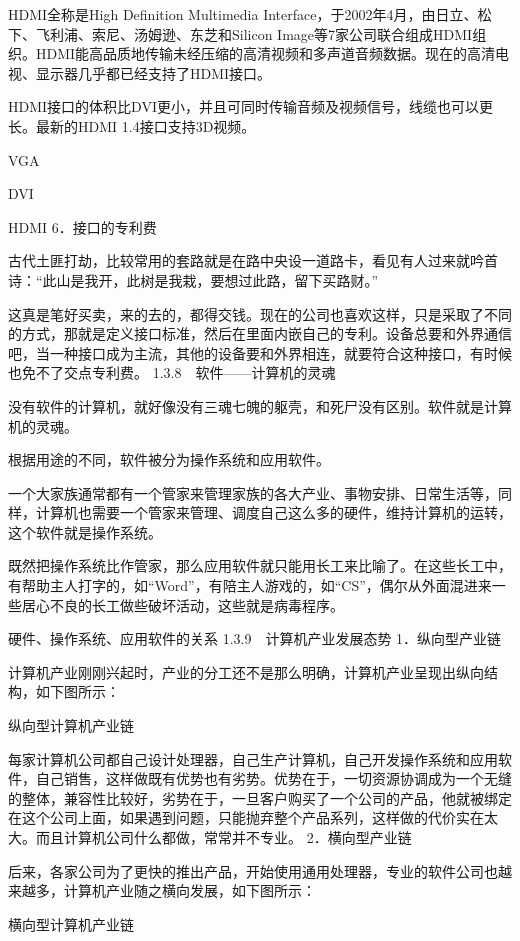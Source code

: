 \documentclass[12pt,UTF8]{ctexbook}
\begin{document}
HDMI全称是High Definition Multimedia Interface，于2002年4月，由日立、松下、飞利浦、索尼、汤姆逊、东芝和Silicon Image等7家公司联合组成HDMI组织。HDMI能高品质地传输未经压缩的高清视频和多声道音频数据。现在的高清电视、显示器几乎都已经支持了HDMI接口。

HDMI接口的体积比DVI更小，并且可同时传输音频及视频信号，线缆也可以更长。最新的HDMI 1.4接口支持3D视频。

VGA

DVI

HDMI
6．接口的专利费

古代土匪打劫，比较常用的套路就是在路中央设一道路卡，看见有人过来就吟首诗：“此山是我开，此树是我栽，要想过此路，留下买路财。”

这真是笔好买卖，来的去的，都得交钱。现在的公司也喜欢这样，只是采取了不同的方式，那就是定义接口标准，然后在里面内嵌自己的专利。设备总要和外界通信吧，当一种接口成为主流，其他的设备要和外界相连，就要符合这种接口，有时候也免不了交点专利费。
1.3.8　软件——计算机的灵魂

没有软件的计算机，就好像没有三魂七魄的躯壳，和死尸没有区别。软件就是计算机的灵魂。

根据用途的不同，软件被分为操作系统和应用软件。

一个大家族通常都有一个管家来管理家族的各大产业、事物安排、日常生活等，同样，计算机也需要一个管家来管理、调度自己这么多的硬件，维持计算机的运转，这个软件就是操作系统。

既然把操作系统比作管家，那么应用软件就只能用长工来比喻了。在这些长工中，有帮助主人打字的，如“Word”，有陪主人游戏的，如“CS”，偶尔从外面混进来一些居心不良的长工做些破坏活动，这些就是病毒程序。

硬件、操作系统、应用软件的关系
1.3.9　计算机产业发展态势
1．纵向型产业链

计算机产业刚刚兴起时，产业的分工还不是那么明确，计算机产业呈现出纵向结构，如下图所示：

纵向型计算机产业链

每家计算机公司都自己设计处理器，自己生产计算机，自己开发操作系统和应用软件，自己销售，这样做既有优势也有劣势。优势在于，一切资源协调成为一个无缝的整体，兼容性比较好，劣势在于，一旦客户购买了一个公司的产品，他就被绑定在这个公司上面，如果遇到问题，只能抛弃整个产品系列，这样做的代价实在太大。而且计算机公司什么都做，常常并不专业。
2．横向型产业链

后来，各家公司为了更快的推出产品，开始使用通用处理器，专业的软件公司也越来越多，计算机产业随之横向发展，如下图所示：

横向型计算机产业链
\end{document}
